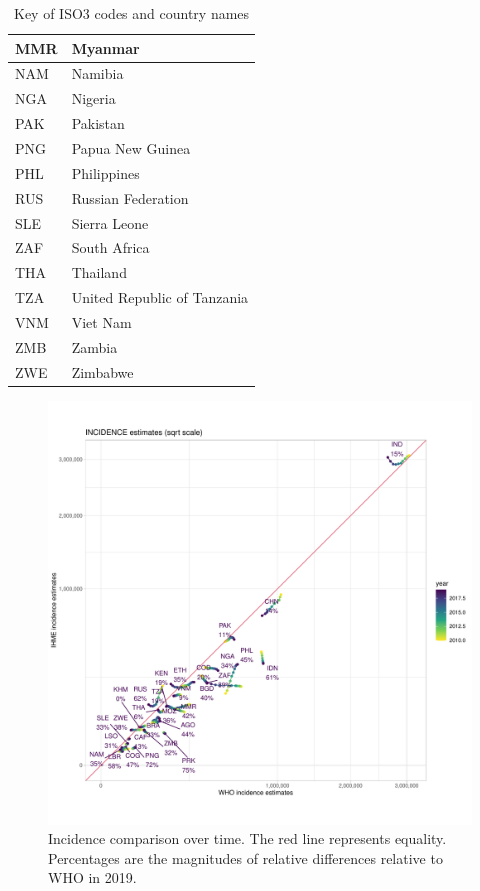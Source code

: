 \documentclass[12pt]{article}
\begin{document}
\begin{table}[]
\begin{tabular}{|l|l|}
MMR           & Myanmar                               \\ \hline
NAM           & Namibia                               \\ \hline
NGA           & Nigeria                               \\ \hline
PAK           & Pakistan                              \\ \hline
PNG           & Papua New Guinea                      \\ \hline
PHL           & Philippines                           \\ \hline
RUS           & Russian Federation                    \\ \hline
SLE           & Sierra Leone                          \\ \hline
ZAF           & South Africa                          \\ \hline
THA           & Thailand                              \\ \hline
TZA           & United Republic of Tanzania           \\ \hline
VNM           & Viet Nam                              \\ \hline
ZMB           & Zambia                                \\ \hline
ZWE           & Zimbabwe                              \\ \hline
\end{tabular}
\caption{Key of ISO3 codes and country names}
\end{table}


\begin{figure}
  \centering
  \includegraphics[width=1\textwidth]{../plots/aF2a.pdf}
  \caption[Incidence comparison over time]{Incidence comparison over time. The
    red line represents equality. Percentages are the magnitudes of relative differences
    relative to WHO in 2019.}
\end{figure}
\end{document}
